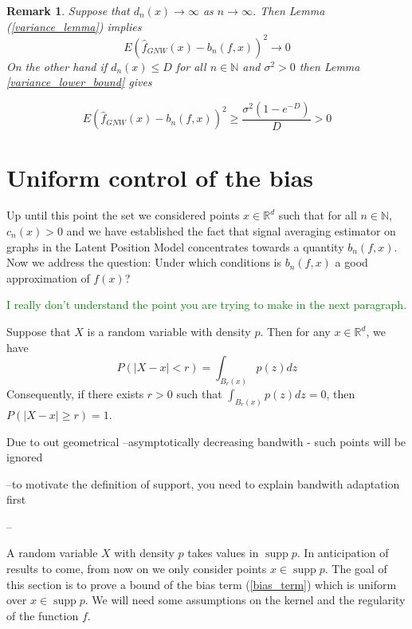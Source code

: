 \documentclass{article}
\newtheorem{remark}[theorem]{Remark}
\newcommand\SB[1]{\textcolor{green}{#1}}
\DeclareMathOperator\supp{supp}
\begin{document}
\begin{remark}
Suppose that $d_n(x)\to\infty$ as $n\to\infty$. Then Lemma (\ref{variance_lemma}) implies
\begin{equation*}
    E(\hat{f}_{GNW}(x)-b_n(f,x))^2\to 0
\end{equation*}
On the other hand if $d_n(x)\leq D$ for all $n\in\mathbb{N}$ and $\sigma^2>0$ then Lemma \ref{variance_lower_bound} gives 

\begin{equation*}
    E(\hat{f}_{GNW}(x)-b_n(f,x))^2\geq \frac{\sigma^2(1-e^{-D})}{D}>0
\end{equation*}

\end{remark}


\section{Uniform control of the bias}
\label{uniform_bias_control}
Up until this point the set we considered points $x\in\mathbb{R}^d$ such that
for all $n\in\mathbb{N}$, $c_n(x)>0$ and we have established the fact that
signal averaging estimator on graphs in the Latent Position Model concentrates
towards a quantity $b_n(f,x)$. Now we address the question: Under which
conditions is $b_n(f,x)$ a good approximation of $f(x)$?

\SB{I really don't understand the point you are trying to make in the next
  paragraph. }

Suppose that $X$ is a random variable with density $p$. Then for any $x\in\mathbb{R}^d$, we have
\begin{equation*}
    P(|X-x|<r)=\int_{B_r(x)}p(z)dz
\end{equation*}
Consequently, if there exists $r>0$ such that $\int_{B_r(x)}p(z)dz=0$, then
$P(|X-x|\geq r)=1$.

Due to out geometrical 
--asymptotically decreasing bandwith - such points will be ignored 


--to motivate the definition of support, you need to explain bandwith adaptation first


--



A random variable $X$ with density $p$ takes values in $\supp{p}$. In anticipation of results to come, from now on we only consider points $x\in\supp{p}$. The goal of this section is to prove a bound of the bias term (\ref{bias_term}) which is uniform over $x\in\supp{p}$. We will need some assumptions on the kernel and the regularity of the function $f$. 
\end{document}
